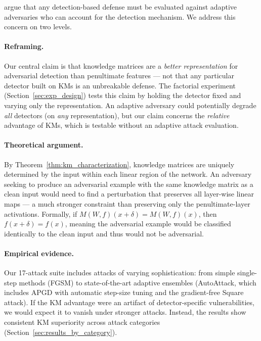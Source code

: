 \citet{tramer2020adaptive} argue that any detection-based defense must be evaluated against adaptive adversaries who can account for the detection mechanism.
We address this concern on two levels.

\paragraph{Reframing.}
Our central claim is that knowledge matrices are a \emph{better representation} for adversarial detection than penultimate features --- not that any particular detector built on KMs is an unbreakable defense.
The factorial experiment (Section~\ref{sec:exp_design}) tests this claim by holding the detector fixed and varying only the representation.
An adaptive adversary could potentially degrade \emph{all} detectors (on \emph{any} representation), but our claim concerns the \emph{relative} advantage of KMs, which is testable without an adaptive attack evaluation.

\paragraph{Theoretical argument.}
By Theorem~\ref{thm:km_characterization}, knowledge matrices are uniquely determined by the input within each linear region of the network.
An adversary seeking to produce an adversarial example with the same knowledge matrix as a clean input would need to find a perturbation that preserves all layer-wise linear maps --- a much stronger constraint than preserving only the penultimate-layer activations.
Formally, if $M(W,f)(x + \delta) = M(W,f)(x)$, then $f(x + \delta) = f(x)$, meaning the adversarial example would be classified identically to the clean input and thus would not be adversarial.

\paragraph{Empirical evidence.}
Our 17-attack suite includes attacks of varying sophistication: from simple single-step methods (FGSM) to state-of-the-art adaptive ensembles (AutoAttack, which includes APGD with automatic step-size tuning and the gradient-free Square attack).
If the KM advantage were an artifact of detector-specific vulnerabilities, we would expect it to vanish under stronger attacks.
Instead, the results show consistent KM superiority across attack categories (Section~\ref{sec:results_by_category}).


